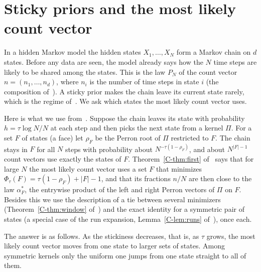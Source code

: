 \section{Sticky priors and the most likely count vector}\label{sec:sticky}

In a hidden Markov model the hidden states $X_1,\dots,X_N$ form a Markov chain
on $d$ states. Before any data are seen, the model already says how the $N$
time steps are likely to be shared among the states. This is the law $P_N$ of
the count vector $n=(n_1,\dots,n_d)$, where $n_i$ is the number of time steps in
state $i$ (the composition of~\cite{paperC}). A sticky prior makes
the chain leave its current state rarely, which is the regime of~\cite{paperC}.
We ask which states the most likely count vector uses.

Here is what we use from~\cite{paperC}. Suppose the chain leaves its
state with probability $h=\tau\log N/N$ at each step and then picks the next
state from a kernel $\Pi$. For a set $F$ of states (a face) let $\rho_F$ be
the Perron root of $\Pi$ restricted to $F$. The chain stays in $F$ for all $N$
steps with probability about $N^{-\tau(1-\rho_F)}$, and about $N^{|F|-1}$ count
vectors use exactly the states of $F$. Theorem~\ref*{C-thm:first} of~\cite{paperC} says that for
large $N$ the most likely count vector uses a set $F$ that minimizes
$\Phi_\tau(F)=\tau(1-\rho_F)+|F|-1$, and that its fractions $n/N$ are then
close to the law $\alpha^*_F$, the entrywise product of the left and right
Perron vectors of $\Pi$ on $F$. Besides this we use the description of a tie
between several minimizers (Theorem~\ref*{C-thm:window} of~\cite{paperC}) and the exact identity
for a symmetric pair of states (a special case of the run expansion,
Lemma~\ref*{C-lem:runs} of~\cite{paperC}), once each.

The answer is as follows. As the stickiness decreases, that is, as $\tau$
grows, the most likely count vector moves from one state to larger sets of
states. Among symmetric kernels only the uniform one jumps from one state
straight to all of them.

